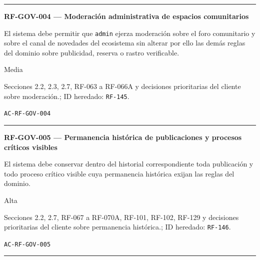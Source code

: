 \documentclass[10pt,letterpaper]{article}
\begin{document}
\vspace{0.25em}\hrule\vspace{0.65em}
\noindent\textbf{RF-GOV-004 --- Moderación administrativa de espacios comunitarios}\par
\begin{description}[style=nextline,leftmargin=3.15cm,labelwidth=2.8cm,font=\normalfont\bfseries]
\item[Obligación] El sistema debe permitir que \texttt{admin} ejerza moderación sobre el foro comunitario y sobre el canal de novedades del ecosistema sin alterar por ello las demás reglas del dominio sobre publicidad, reserva o rastro verificable.
\item[Prioridad] Media
\item[Procedencia] Secciones 2.2, 2.3, 2.7, RF-063 a RF-066A y decisiones prioritarias del cliente sobre moderación.; ID heredado: \texttt{RF-145}.
\item[Verificación] \texttt{AC-RF-GOV-004}
\end{description}
\vspace{0.25em}\hrule\vspace{0.65em}
\noindent\textbf{RF-GOV-005 --- Permanencia histórica de publicaciones y procesos críticos visibles}\par
\begin{description}[style=nextline,leftmargin=3.15cm,labelwidth=2.8cm,font=\normalfont\bfseries]
\item[Obligación] El sistema debe conservar dentro del historial correspondiente toda publicación y todo proceso crítico visible cuya permanencia histórica exijan las reglas del dominio.
\item[Prioridad] Alta
\item[Procedencia] Secciones 2.2, 2.7, RF-067 a RF-070A, RF-101, RF-102, RF-129 y decisiones prioritarias del cliente sobre permanencia histórica.; ID heredado: \texttt{RF-146}.
\item[Verificación] \texttt{AC-RF-GOV-005}
\end{description}
\vspace{0.25em}\hrule\vspace{0.65em}
\end{document}
